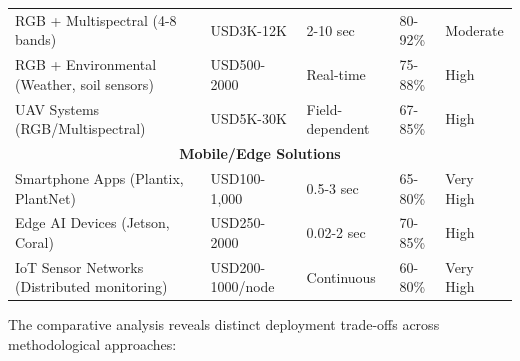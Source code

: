 \documentclass[sn-mathphys]{sn-jnl}
\theoremstyle{thmstyleone}%
\theoremstyle{thmstyletwo}%
\theoremstyle{thmstylethree}%
\begin{document}
\begin{table}[h!]
\begin{tabular}{@{}p{4.5cm}p{1.5cm}p{1.5cm}p{2cm}p{1.5cm}@{}}
\midrule
RGB + Multispectral (4-8 bands) & USD3K-12K \citep{advexure2025multispectral} & 2-10 sec \citep{coptrz2024multispectral} & 80-92\% \citep{cao2018fast} & Moderate \\
RGB + Environmental (Weather, soil sensors) & USD500-2000 \citep{coptrz2024cost} & Real-time \citep{das2024machine} & 75-88\% \citep{khan2025integration} & High \\
UAV Systems (RGB/Multispectral) & USD5K-30K \citep{advexure2025mavic,coptrz2024multispectral} & Field-dependent \citep{gano2024drone} & 67-85\% \citep{garcia2019comparison} & High \\
\midrule
\multicolumn{5}{c}{\textbf{Mobile/Edge Solutions}} \\
\midrule
Smartphone Apps (Plantix, PlantNet) & USD100-1,000 \citep{coptrz2024cost} & 0.5-3 sec \citep{rani2023role} & 65-80\% \citep{strey2022plantix} & Very High \\
Edge AI Devices (Jetson, Coral) & USD250-2000 \citep{nvidia2024jetson,nvidia2024orin} & 0.02-2 sec \citep{mahmud2024light} & 70-85\% \citep{mahmud2024light} & High \\
IoT Sensor Networks (Distributed monitoring) & USD200-1000/node \citep{dfi2024edge} & Continuous \citep{nvidia2024edge} & 60-80\% \citep{neupane2021automatic} & Very High \\
\bottomrule
\end{tabular}
\end{table}

The comparative analysis reveals distinct deployment trade-offs across methodological approaches:
\end{document}
